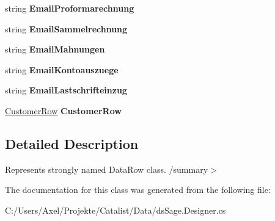 \begin{DoxyCompactItemize}
\item 
string {\bfseries Email\+Proformarechnung}\hypertarget{class_products_1_1_data_1_1ds_sage_1_1cpm__kontaktemail_row_a44047da9a9b9e05020b89a8719c95908}{}\label{class_products_1_1_data_1_1ds_sage_1_1cpm__kontaktemail_row_a44047da9a9b9e05020b89a8719c95908}

\item 
string {\bfseries Email\+Sammelrechnung}\hypertarget{class_products_1_1_data_1_1ds_sage_1_1cpm__kontaktemail_row_aec7741b8f538af2e9c2edd8f98968e17}{}\label{class_products_1_1_data_1_1ds_sage_1_1cpm__kontaktemail_row_aec7741b8f538af2e9c2edd8f98968e17}

\item 
string {\bfseries Email\+Mahnungen}\hypertarget{class_products_1_1_data_1_1ds_sage_1_1cpm__kontaktemail_row_ae02cb38f671b5c02aae4f683b629b81f}{}\label{class_products_1_1_data_1_1ds_sage_1_1cpm__kontaktemail_row_ae02cb38f671b5c02aae4f683b629b81f}

\item 
string {\bfseries Email\+Kontoauszuege}\hypertarget{class_products_1_1_data_1_1ds_sage_1_1cpm__kontaktemail_row_aabdecd3de1f3421b14b364eaebe60a07}{}\label{class_products_1_1_data_1_1ds_sage_1_1cpm__kontaktemail_row_aabdecd3de1f3421b14b364eaebe60a07}

\item 
string {\bfseries Email\+Lastschrifteinzug}\hypertarget{class_products_1_1_data_1_1ds_sage_1_1cpm__kontaktemail_row_a38eff0834b48ae10bad520293e010e6c}{}\label{class_products_1_1_data_1_1ds_sage_1_1cpm__kontaktemail_row_a38eff0834b48ae10bad520293e010e6c}

\item 
\hyperlink{class_products_1_1_data_1_1ds_sage_1_1_customer_row}{Customer\+Row} {\bfseries Customer\+Row}\hypertarget{class_products_1_1_data_1_1ds_sage_1_1cpm__kontaktemail_row_a01da8901dbc04f59ada0dd3a67145df9}{}\label{class_products_1_1_data_1_1ds_sage_1_1cpm__kontaktemail_row_a01da8901dbc04f59ada0dd3a67145df9}

\end{DoxyCompactItemize}


\subsection{Detailed Description}
Represents strongly named Data\+Row class. /summary$>$ 

The documentation for this class was generated from the following file\+:\begin{DoxyCompactItemize}
\item 
C\+:/\+Users/\+Axel/\+Projekte/\+Catalist/\+Data/ds\+Sage.\+Designer.\+cs\end{DoxyCompactItemize}
